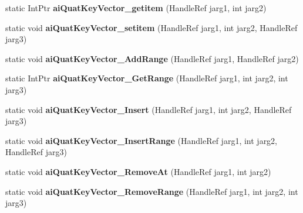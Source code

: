\begin{DoxyCompactItemize}
\item 
\hypertarget{class_assimp_p_i_n_v_o_k_e_a740f7bbfdc6cc954670246ba50ed2979}{static Int\+Ptr {\bfseries ai\+Quat\+Key\+Vector\+\_\+getitem} (Handle\+Ref jarg1, int jarg2)}\label{class_assimp_p_i_n_v_o_k_e_a740f7bbfdc6cc954670246ba50ed2979}

\item 
\hypertarget{class_assimp_p_i_n_v_o_k_e_adad4995309930fb320ebd5693cd062c5}{static void {\bfseries ai\+Quat\+Key\+Vector\+\_\+setitem} (Handle\+Ref jarg1, int jarg2, Handle\+Ref jarg3)}\label{class_assimp_p_i_n_v_o_k_e_adad4995309930fb320ebd5693cd062c5}

\item 
\hypertarget{class_assimp_p_i_n_v_o_k_e_af5833de200b28aa456e5dc23030badbd}{static void {\bfseries ai\+Quat\+Key\+Vector\+\_\+\+Add\+Range} (Handle\+Ref jarg1, Handle\+Ref jarg2)}\label{class_assimp_p_i_n_v_o_k_e_af5833de200b28aa456e5dc23030badbd}

\item 
\hypertarget{class_assimp_p_i_n_v_o_k_e_a08e871174ed70ca48b00ff6289f38855}{static Int\+Ptr {\bfseries ai\+Quat\+Key\+Vector\+\_\+\+Get\+Range} (Handle\+Ref jarg1, int jarg2, int jarg3)}\label{class_assimp_p_i_n_v_o_k_e_a08e871174ed70ca48b00ff6289f38855}

\item 
\hypertarget{class_assimp_p_i_n_v_o_k_e_ada01d5faab05edf763154c9e6445f92e}{static void {\bfseries ai\+Quat\+Key\+Vector\+\_\+\+Insert} (Handle\+Ref jarg1, int jarg2, Handle\+Ref jarg3)}\label{class_assimp_p_i_n_v_o_k_e_ada01d5faab05edf763154c9e6445f92e}

\item 
\hypertarget{class_assimp_p_i_n_v_o_k_e_a43f5278712118faf483f2cdd90aa1872}{static void {\bfseries ai\+Quat\+Key\+Vector\+\_\+\+Insert\+Range} (Handle\+Ref jarg1, int jarg2, Handle\+Ref jarg3)}\label{class_assimp_p_i_n_v_o_k_e_a43f5278712118faf483f2cdd90aa1872}

\item 
\hypertarget{class_assimp_p_i_n_v_o_k_e_ab0a15bb040d6c3ed6e8e6593546d4d2a}{static void {\bfseries ai\+Quat\+Key\+Vector\+\_\+\+Remove\+At} (Handle\+Ref jarg1, int jarg2)}\label{class_assimp_p_i_n_v_o_k_e_ab0a15bb040d6c3ed6e8e6593546d4d2a}

\item 
\hypertarget{class_assimp_p_i_n_v_o_k_e_a379dc9b09495b58dc3ac0bf566935bb1}{static void {\bfseries ai\+Quat\+Key\+Vector\+\_\+\+Remove\+Range} (Handle\+Ref jarg1, int jarg2, int jarg3)}\label{class_assimp_p_i_n_v_o_k_e_a379dc9b09495b58dc3ac0bf566935bb1}


\end{DoxyCompactItemize}
